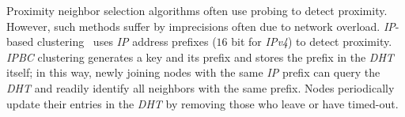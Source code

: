 Proximity neighbor selection algorithms often use probing 
to detect proximity. 
However, such methods suffer by imprecisions often due to network overload.
{\sl IP}-based clustering~\cite{KM2007} 
uses {\sl IP} address prefixes ($16$ bit for {\sl IPv4}) 
to detect proximity. 
\emph{IPBC} clustering generates a key and its prefix %
and stores the prefix in the \emph{DHT} itself;
in this way, newly joining nodes with the same {\sl IP} prefix 
can query the \emph{DHT} and readily
identify all neighbors with the same prefix.  
Nodes periodically update their entries in the \emph{DHT} 
by removing those who leave or have timed-out.

